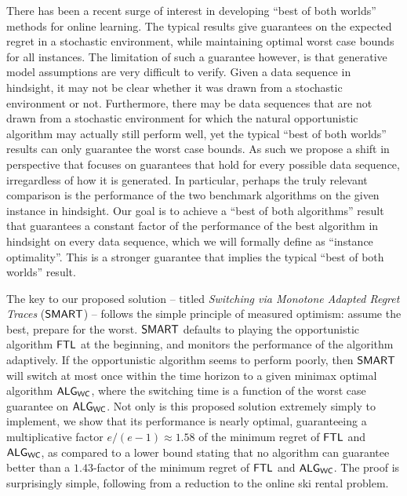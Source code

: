 There has been a recent surge of interest in developing “best of both worlds” methods for online learning. The typical results give guarantees on the expected regret in a stochastic environment, while maintaining optimal worst case bounds for all instances. The limitation of such a guarantee however, is that generative model assumptions are very difficult to verify. Given a data sequence in hindsight, it may not be clear whether it was drawn from a stochastic environment or not. Furthermore, there may be data sequences that are not drawn from a stochastic environment for which the natural opportunistic algorithm may actually still perform well, yet the typical “best of both worlds” results can only guarantee the worst case bounds. As such we propose a shift in perspective that focuses on guarantees that hold for every possible data sequence, irregardless of how it is generated. In particular, perhaps the truly relevant comparison is the performance of the two benchmark algorithms on the given instance in hindsight. Our goal is to achieve a ``best of both algorithms'' result that guarantees a constant factor of the performance of the best algorithm in hindsight on every data sequence, which we will formally define as ``instance optimality''. This is a stronger guarantee that implies the typical ``best of both worlds'' result.

The key to our proposed solution -- titled \emph{Switching via Monotone Adapted Regret Traces} ($\mathsf{SMART}$) -- follows the simple principle of measured optimism: assume the best, prepare for the worst. $\mathsf{SMART}$ defaults to playing the opportunistic algorithm $\mathsf{FTL}$ at the beginning, and monitors the performance of the algorithm adaptively. If the opportunistic algorithm seems to perform poorly, then $\mathsf{SMART}$ will switch at most once within the time horizon to a given minimax optimal algorithm $\mathsf{ALG}_{\mathsf{WC}}$, where the switching time is a function of the worst case guarantee on $\mathsf{ALG}_{\mathsf{WC}}$. Not only is this proposed solution extremely simply to implement, we show that its performance is nearly optimal, guaranteeing a multiplicative factor $e/(e-1) \approx 1.58$ of the minimum regret of $\mathsf{FTL}$ and $\mathsf{ALG}_{\mathsf{WC}}$, as compared to a lower bound stating that no algorithm can guarantee better than a $1.43$-factor of the minimum regret of $\mathsf{FTL}$ and $\mathsf{ALG}_{\mathsf{WC}}$. The proof is surprisingly simple, following from a reduction to the online ski rental problem.

